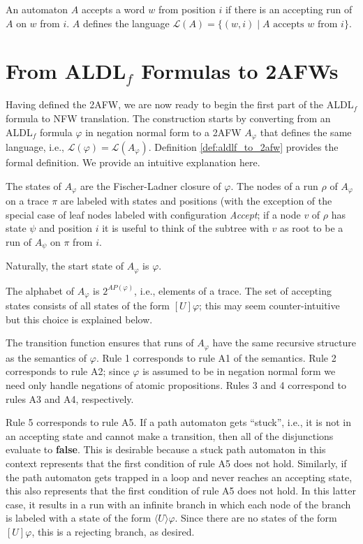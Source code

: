 \documentclass[10pt,a4paper]{amsart}
\theoremstyle{plain}
\theoremstyle{definition}
\theoremstyle{definition}
\newcommand{\dbox}[1]{\langle #1 \rangle}
\newcommand{\bbox}[1]{[ #1 ]}
\DeclareMathOperator{\?}{?}
\begin{document}
An automaton $A$ accepts a word $w$ from position $i$ if there is an accepting run of $A$ on $w$ from $i$.
$A$ defines the language $\mathcal{L}(A) = \{ (w,i) \mid A \text{ accepts } w \text{ from } i \}$.

\section{\texorpdfstring{From ALDL$_f$ Formulas to 2AFWs}{From ALDLf Formulas to 2AFWs}}
\label{ch:2afwtoaldlf}

Having defined the 2AFW, we are now ready to begin the first part of the ALDL$_f$ formula to NFW translation. The construction starts by converting from an ALDL$_f$ formula $\varphi$  in negation normal form to a 2AFW $A_\varphi$ that defines the same language, i.e., $\mathcal{L}(\varphi) = \mathcal{L}(A_\varphi)$.
Definition \ref{def:aldlf_to_2afw} provides the formal definition. We provide an intuitive explanation here.

The states of $A_\varphi$ are the Fischer-Ladner closure of
$\varphi$. The nodes of a run $\rho$ of $A_\varphi$ on a trace $\pi$
are labeled with states and positions (with
the exception of the special case of leaf nodes labeled with configuration \textit{Accept};
if a node $v$ of $\rho$ has state $\psi$ and position $i$ it is useful to think of the
subtree with $v$ as root to be a run of $A_\psi$ on $\pi$ from $i$.

Naturally, the start state of $A_\varphi$ is $\varphi$.

The alphabet of $A_\varphi$ is $2^{AP(\varphi)}$, i.e., elements of a trace. The set of accepting states consists of all states of the form $\bbox{U}\varphi$; this may seem counter-intuitive but this choice is explained below.

The transition function ensures that runs of $A_\varphi$ have the same recursive structure as the semantics of $\varphi$. Rule 1 corresponds to rule A1 of the semantics. Rule 2 corresponds to rule A2; since $\varphi$ is assumed to be in negation normal form we need only handle
negations of atomic propositions. Rules 3 and 4 correspond to rules A3 and A4, respectively.

Rule 5 corresponds to rule A5. If a path automaton gets ``stuck'', i.e., it is not in an accepting state and cannot make a transition, then all of the disjunctions evaluate to \textbf{false}. This is desirable because a stuck path automaton in this context represents that the first condition of rule A5 does not hold. Similarly, if the path automaton gets trapped in a loop and never reaches an accepting state, this also represents that the first condition of rule A5 does not hold. In this latter case, it results in a run with an infinite branch in which each node of the branch is labeled with a state of the form $\dbox{U}\varphi$. Since there are no states of the form $\bbox{U}\varphi$, this is a rejecting branch, as desired.
\end{document}
